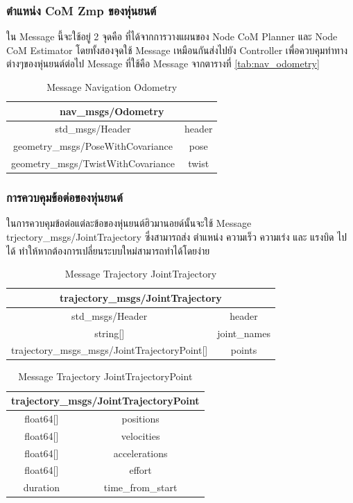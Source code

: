 \subsubsection*{ตำแหน่ง CoM Zmp ของหุ่นยนต์}
ใน Message นี้จะใช้อยู่ 2 จุดคือ ที่ได้จากการวางแผนของ Node CoM Planner และ Node CoM Estimator
โดยทั้งสองจุดใช้ Message เหมือนกันส่งไปยัง Controller เพื่อควบคุมท่าทางต่างๆของหุ่นยนต์ต่อไป
Message ที่ใช้คือ Message จากตารางที่ \ref{tab:nav_odometry}
\begin{table}[!ht]
	\centering
	\begin{tabular}{| c | c |}
		\hline
		\multicolumn{2}{|c|}{nav\_msgs/Odometry}\\
		\hline
		std\_msgs/Header & header \\
		geometry\_msgs/PoseWithCovariance & pose \\
		geometry\_msgs/TwistWithCovariance & twist \\
		\hline
	\end{tabular}
	\caption*{Message Navigation Odometry}
\end{table}

\clearpage
\subsubsection*{การควบคุมข้อต่อของหุ่นยนต์}
ในการควบคุมข้อต่อแต่ละข้อของหุ่นยนต์ฮิวมานอยด์นั้นจะใช้ Message trjectory\_msgs/JointTrajectory
ซึ่งสามารถส่ง ตำแหน่ง ความเร็ว ความเร่ง และ แรงบิด ไปได้ ทำให้หากต้องการเปลี่ยนระบบใหม่สามารถทำได้โดยง่าย

\begin{table}[!ht]
	\centering
	\begin{tabular}{| c | c |}
		\hline
		\multicolumn{2}{|c|}{trajectory\_msgs/JointTrajectory}\\
		\hline
		std\_msgs/Header & header \\
		string[] & joint\_names \\
		trajectory\_msgs\_msgs/JointTrajectoryPoint[] & points \\
		\hline
	\end{tabular}
	\caption{Message Trajectory JointTrajectory}
	\label{tab:trajectory_jointrajectory}
\end{table}
\begin{table}[!ht]
	\centering
	\begin{tabular}{| c | c |}
		\hline
		\multicolumn{2}{|c|}{trajectory\_msgs/JointTrajectoryPoint}\\
		\hline
		float64[] & positions \\
		float64[] & velocities \\
  		float64[] & accelerations \\
  		float64[] & effort \\
  		duration & time\_from\_start \\
		\hline
	\end{tabular}
	\caption{Message Trajectory JointTrajectoryPoint}
	\label{tab:trajectory_jointrajectorypoint}
\end{table}

